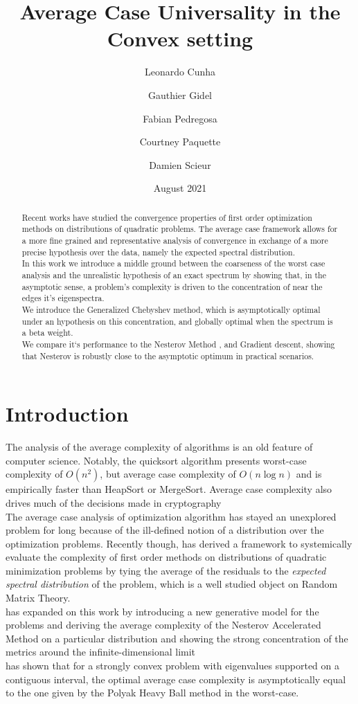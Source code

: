 \documentclass{article}
\title{Average Case Universality in the Convex setting}
\author{Leonardo Cunha
\and Gauthier Gidel \\
\and Fabian Pedregosa \\
\and Courtney Paquette \\
\and Damien Scieur}
\date{August 2021}
\begin{document}
\maketitle
\begin{abstract}
    Recent works \cite{pedregosa2020acceleration,paquette2020halting,scieur2020universal} have studied the convergence properties of first order optimization methods on distributions of quadratic problems. 
    The average case framework allows for a more fine grained and representative analysis of convergence in exchange of a more precise hypothesis over the data, namely the expected spectral distribution. \\
    In this work we introduce a middle ground between the coarseness of the  worst case analysis and the unrealistic hypothesis of an exact spectrum by showing that, in the asymptotic sense, a problem's complexity is driven to the concentration of near the edges it's eigenspectra. \\
    We introduce the Generalized Chebyshev method, which is   asymptotically optimal under an hypothesis on this concentration, and globally optimal when the spectrum is a beta weight.\\
    We compare it`s performance to the Nesterov Method \cite{nesterov2003introductory}, and Gradient descent, showing that Nesterov is robustly close to the asymptotic optimum in practical scenarios.
\end{abstract}
\section{Introduction}
The analysis of the average complexity of algorithms is an old feature of computer science. Notably, the quicksort algorithm presents worst-case complexity of $O(n^2)$, but average case complexity of $O(n\log n)$ and is  empirically faster than HeapSort or MergeSort. Average case complexity also drives much of the decisions made in cryptography \cite{bogdanov2006average}\\
The average case analysis of optimization algorithm has stayed an unexplored problem for long because of the ill-defined notion of a distribution over the optimization problems. Recently though, \cite{pedregosa2020acceleration} has derived a framework to systemically evaluate the complexity of first order methods on distributions of quadratic minimization problems by tying the average of the residuals to the \textit{expected spectral distribution} of the problem, which is a well studied object on Random Matrix Theory. \\
\cite{paquette2020halting} has expanded on this work by introducing a new generative model for the problems and deriving the average complexity of the Nesterov Accelerated Method on a particular distribution and showing the strong concentration of the metrics around the infinite-dimensional limit \\
\cite{scieur2020universal} has shown that for a strongly convex problem with eigenvalues supported on a contiguous interval, the optimal average case complexity is asymptotically equal to the one given by the Polyak Heavy Ball method in the worst-case.  
\end{document}
